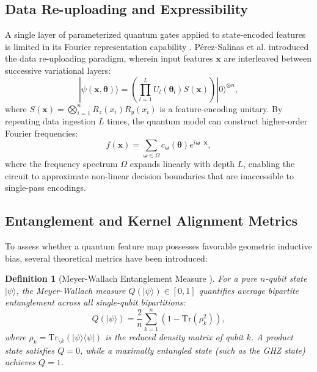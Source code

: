 \documentclass[10pt,twocolumn,twoside,a4paper]{article}
\newcommand{\ket}[1]{|#1\rangle}
\newcommand{\bra}[1]{\langle#1|}
\newtheorem{definition}{Definition}
\begin{document}
\subsection{Data Re-uploading and Expressibility}
A single layer of parameterized quantum gates applied to state-encoded features is limited in its Fourier representation capability \cite{schuld2021effect}. P\'erez-Salinas et al. \cite{perez2020data} introduced the data re-uploading paradigm, wherein input features $\mathbf{x}$ are interleaved between successive variational layers:
\begin{equation}
    \ket{\psi(\mathbf{x}, \boldsymbol{\theta})} = \left( \prod_{l=1}^{L} U_l(\boldsymbol{\theta}_l) S(\mathbf{x}) \right) \ket{0}^{\otimes n},
\end{equation}
where $S(\mathbf{x}) = \bigotimes_{i=1}^n R_z(x_i) R_y(x_i)$ is a feature-encoding unitary. By repeating data ingestion $L$ times, the quantum model can construct higher-order Fourier frequencies:
\begin{equation}
    f(\mathbf{x}) = \sum_{\boldsymbol{\omega} \in \Omega} c_{\boldsymbol{\omega}}(\boldsymbol{\theta}) e^{i \boldsymbol{\omega} \cdot \mathbf{x}},
\end{equation}
where the frequency spectrum $\Omega$ expands linearly with depth $L$, enabling the circuit to approximate non-linear decision boundaries that are inaccessible to single-pass encodings.

\subsection{Entanglement and Kernel Alignment Metrics}
To assess whether a quantum feature map possesses favorable geometric inductive bias, several theoretical metrics have been introduced:
\begin{definition}[Meyer-Wallach Entanglement Measure \cite{meyer2002global, brennen2003observable}]
For a pure $n$-qubit state $\ket{\psi}$, the Meyer-Wallach measure $Q(\ket{\psi}) \in [0, 1]$ quantifies average bipartite entanglement across all single-qubit bipartitions:
\begin{equation}
    Q(\ket{\psi}) = \frac{2}{n} \sum_{k=1}^n \left( 1 - \text{Tr}(\rho_k^2) \right),
    \label{eq:meyer_wallach_def}
\end{equation}
where $\rho_k = \text{Tr}_{\setminus k}(\ket{\psi}\bra{\psi})$ is the reduced density matrix of qubit $k$. A product state satisfies $Q = 0$, while a maximally entangled state (such as the GHZ state) achieves $Q = 1$.
\end{definition}
\end{document}
